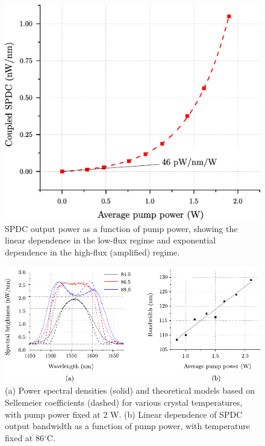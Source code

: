 \begin{figure}[t]
\begin{center}
\includegraphics[width=12cm]{figure-pcoct-data-power.pdf}
\caption{SPDC output power as a function of pump power, showing the linear dependence in the low-flux regime and exponential dependence in the high-flux (amplified) regime.}
\label{figure:pcoct-data-power}
\end{center}
\end{figure}

\begin{figure}[t]
\begin{center}
\includegraphics[width=\textwidth]{figure-pcoct-data-spectrum.pdf}
\caption{(a) Power spectral densities (solid) and theoretical models based on Sellemeier coefficients (dashed) for various crystal temperatures, with pump power fixed at 2 W. (b) Linear dependence of SPDC output bandwidth as a function of pump power, with temperature fixed at 86$^\circ$C.}
\label{figure:pcoct-data-spectrum}
\end{center}
\end{figure}



